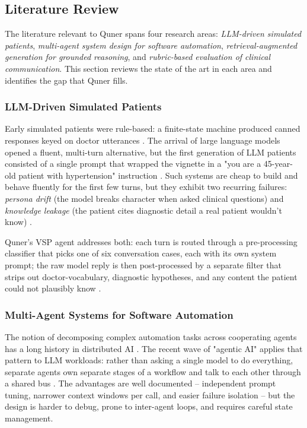 \documentclass{article}
\begin{document}
\subsection{Literature Review}

The literature relevant to Quner spans four research areas: \emph{LLM-driven simulated patients}, \emph{multi-agent system design for software automation}, \emph{retrieval-augmented generation for grounded reasoning}, and \emph{rubric-based evaluation of clinical communication}. This section reviews the state of the art in each area and identifies the gap that Quner fills.

\subsubsection{LLM-Driven Simulated Patients}

Early simulated patients were rule-based: a finite-state machine produced canned responses keyed on doctor utterances \cite{Plale2013BigDO}. The arrival of large language models opened a fluent, multi-turn alternative, but the first generation of LLM patients consisted of a single prompt that wrapped the vignette in a "you are a 45-year-old patient with hypertension" instruction \cite{Topsakal2023CreatingLL}. Such systems are cheap to build and behave fluently for the first few turns, but they exhibit two recurring failures: \emph{persona drift} (the model breaks character when asked clinical questions) and \emph{knowledge leakage} (the patient cites diagnostic detail a real patient wouldn't know) \cite{Azzara2023PeranPP}.

Quner's VSP agent addresses both: each turn is routed through a pre-processing classifier that picks one of six conversation cases, each with its own system prompt; the raw model reply is then post-processed by a separate filter that strips out doctor-vocabulary, diagnostic hypotheses, and any content the patient could not plausibly know \cite{Zhang2023SentimentAI}.

\subsubsection{Multi-Agent Systems for Software Automation}

The notion of decomposing complex automation tasks across cooperating agents has a long history in distributed AI \cite{Cheptsov2013IntroducingAN}. The recent wave of "agentic AI" applies that pattern to LLM workloads: rather than asking a single model to do everything, separate agents own separate stages of a workflow and talk to each other through a shared bus \cite{Kulkarni2023TheEO,Jing2024WhenLL}. The advantages are well documented -- independent prompt tuning, narrower context windows per call, and easier failure isolation \cite{Rygl2017SemanticVE} -- but the design is harder to debug, prone to inter-agent loops, and requires careful state management.
\end{document}

